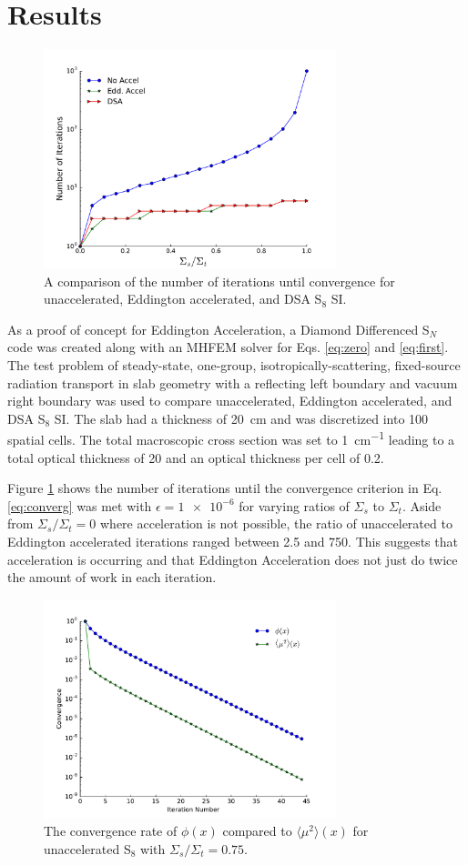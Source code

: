 \documentclass{anstrans}
\newcommand{\SN}{S$_N$\xspace}
\newcommand{\edd}{\langle \mu^2 \rangle}
\begin{document}
\section{Results}
	\begin{figure}
		\centering
		\includegraphics[width=8.5cm]{accel.pdf}
		\caption{A comparison of the number of iterations until convergence for unaccelerated, Eddington accelerated, and DSA S$_8$ SI. }
		\label{fig:comparison}
	\end{figure}

	As a proof of concept for Eddington Acceleration, a Diamond Differenced \SN code was created along with an MHFEM solver for Eqs. \ref{eq:zero} and \ref{eq:first}. The test problem of steady-state, one-group, isotropically-scattering, fixed-source radiation transport in slab geometry with a reflecting left boundary and vacuum right boundary was used to compare unaccelerated, Eddington accelerated, and DSA S$_8$ SI. The slab had a thickness of \SI{20}{cm} and was discretized into 100 spatial cells. The total macroscopic cross section was set to \SI{1}{cm^{-1}} leading to a total optical thickness of 20 and an optical thickness per cell of 0.2. 

	Figure \ref{fig:comparison} shows the number of iterations until the convergence criterion in  Eq. \ref{eq:converg} was met with $\epsilon = \num{1e-6}$ for varying ratios of $\Sigma_s$ to $\Sigma_t$. Aside from $\Sigma_s/\Sigma_t = 0$ where acceleration is not possible, the ratio of unaccelerated to Eddington accelerated iterations ranged between 2.5 and 750. This suggests that acceleration is occurring and that Eddington Acceleration does not just do twice the amount of work in each iteration. 

	\begin{figure}
		\centering
		\includegraphics[width=8.5cm]{eddCon_si.pdf}
		\caption{The convergence rate of $\phi(x)$ compared to $\edd(x)$ for unaccelerated S$_8$ with $\Sigma_s/\Sigma_t = 0.75$. }
		\label{fig:conv_si}
	\end{figure}
\end{document}
